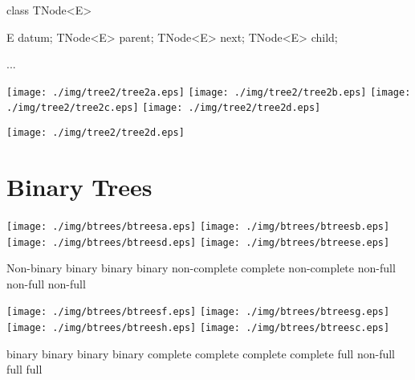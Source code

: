 \documentclass[a4paper, 9pt]{extarticle}
\begin{document}
\begin{blackboard}
class TNode<E> {
    E datum;
    TNode<E> parent;
    TNode<E> next;
    TNode<E> child;

    ...
}
\end{blackboard}

\texttt{[image: ./img/tree2/tree2a.eps]}
\texttt{[image: ./img/tree2/tree2b.eps]}
\texttt{[image: ./img/tree2/tree2c.eps]}
\texttt{[image: ./img/tree2/tree2d.eps]}

\begin{center}
\texttt{[image: ./img/tree2/tree2d.eps]}
\end{center}











\newpage


\section{Binary Trees}



\texttt{[image: ./img/btrees/btreesa.eps]}
\texttt{[image: ./img/btrees/btreesb.eps]}
\texttt{[image: ./img/btrees/btreesd.eps]}
\texttt{[image: ./img/btrees/btreese.eps]}

\begin{blackboard}
Non-binary               binary                   binary                     binary
                         non-complete             complete                   non-complete
                         non-full                 non-full                   non-full
\end{blackboard}

\texttt{[image: ./img/btrees/btreesf.eps]}
\texttt{[image: ./img/btrees/btreesg.eps]}
\texttt{[image: ./img/btrees/btreesh.eps]}
\texttt{[image: ./img/btrees/btreesc.eps]}

\begin{blackboard}
binary                   binary                   binary                     binary
complete                 complete                 complete                   complete
full                     non-full                 full                       full
\end{blackboard}
\end{document}
